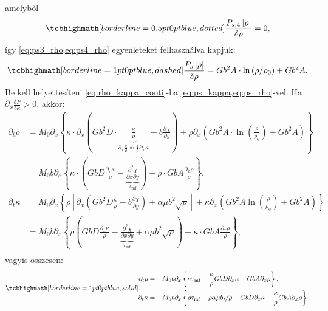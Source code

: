 \documentclass[10pt,a4paper]{scrartcl}
\begin{document}
amelyből
\begin{equation} \label{eq:ps4_rho}
\tcbhighmath[borderline={0.5pt}{0pt}{blue,dotted}]{\frac{{{P_{s,4}}\left[ \rho  \right]}}{{\delta \rho }} =  0,}
\end{equation}
így \cref{eq:ps3_rho,eq:ps4_rho} egyenleteket felhasználva kapjuk:
\begin{equation} \label{eq:ps_rho}
\tcbhighmath[borderline={1pt}{0pt}{blue,dashed}]{\frac{{{P_s}\left[ \rho  \right]}}{{\delta \rho }} = G{b^2}A \cdot \ln \left( {\rho /{\rho _0}} \right) + G{b^2}A .}
\end{equation}
Be kell helyettesíteni \cref{eq:rho_kappa_conti}-ba \cref{eq:ps_kappa,eq:ps_rho}-vel. Ha ${{\partial _x}\frac{{\delta P}}{{\delta \kappa }}} > 0$, akkor:
\[\begin{aligned}
  {\partial _t}\rho  &  = {M_0}{\partial _x}\left\{ {\kappa  \cdot {\partial _x}\left( {G{b^2}D \cdot \underbrace {\frac{\kappa }{\rho }}_{{\partial _x}\frac{\kappa }{\rho } \approx \frac{1}{\rho }{\partial _x}\kappa } - b\frac{{\partial \chi }}{{\partial y}}} \right) + \rho {\partial _x}\left( {G{b^2}A \cdot \ln \left( {\frac{\rho }{{{\rho _0}}}} \right) + G{b^2}A} \right)} \right\} \\ 
   &  = {M_0}b{\partial _x}\left\{ {\kappa  \cdot \left( {GbD\frac{{{\partial _x}\kappa }}{\rho } - \underbrace {\frac{{{\partial ^2}\chi }}{{\partial x\partial y}}}_{{\tau _{{\text{mf}}}}}} \right) + \rho  \cdot GbA\frac{{{\partial _x}\rho }}{\rho }} \right\}, \\ 
  {\partial _t}\kappa  &  = {M_0}{\partial _x}\left\{ {\rho \left[ {{\partial _x}\left( {G{b^2}D\frac{\kappa }{\rho } - b\frac{{\partial \chi }}{{\partial y}}} \right) + \alpha \mu {b^2}\sqrt \rho } \right] + \kappa {\partial _x}\left( {G{b^2}A\ln \left( {\frac{\rho }{{{\rho _0}}}} \right) + G{b^2}A} \right)} \right\} \\ 
   &  = {M_0}b{\partial _x}\left\{ {\rho \left( {GbD\frac{{{\partial _x}\kappa }}{\rho } - \underbrace {\frac{{{\partial ^2}\chi }}{{\partial x\partial y}}}_{{\tau _{{\text{mf}}}}} + \alpha \mu {b^2}\sqrt \rho } \right) + \kappa  \cdot GbA\frac{{{\partial _x}\rho }}{\rho }} \right\}, \\ 
\end{aligned} \]
vagyis összesen:
\begin{gather} \label{eq:rho_kappa}
\tcbhighmath[borderline={1pt}{0pt}{blue,solid}]{
\begin{aligned}
  {\partial _t}\rho  &  =  - {M_0}b{\partial _x}\left\{ {\kappa {\tau _{{\text{mf}}}} - \frac{\kappa }{\rho }GbD{\partial _x}\kappa  - GbA{\partial _x}\rho } \right\}, \\ 
  {\partial _t}\kappa  &  =  - {M_0}b{\partial _x}\left\{ {\rho {\tau _{{\text{mf}}}} - \rho \alpha \mu b\sqrt \rho - GbD{\partial _x}\kappa  - \frac{\kappa }{\rho } GbA{\partial _x}\rho } \right\}.
  \end{aligned}}
\end{gather}
\end{document}
